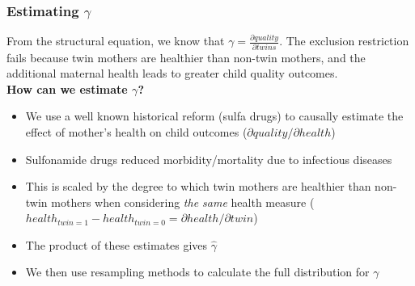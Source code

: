 \documentclass[9pt,letterpaper,subeqn]{beamer}
\begin{document}



\begin{frame}[label=gammaDiscuss]
  \frametitle{Estimating $\gamma$}
From the structural equation, we know that $\gamma=\frac{\partial quality}{\partial twins}$.  The exclusion restriction fails because twin mothers are healthier than non-twin mothers, and the additional maternal health leads to greater child quality outcomes.
\vspace{4mm} \\

\textbf{How can we estimate $\gamma$?}
  \begin{itemize}
  \item We use a well known historical reform (sulfa drugs) to causally estimate the effect of mother's health on child outcomes ($\partial quality/\partial health$)
  \item Sulfonamide drugs reduced morbidity/mortality due to infectious diseases
  \item This is scaled by the degree to which twin mothers are healthier than non-twin mothers when considering \emph{the same} health measure ($health_{twin=1}-health_{twin=0}=\partial health/\partial twin$)
  \item The product of these estimates gives $\hat\gamma$ %
  \item We then use resampling methods to calculate the full distribution for $\gamma$
  \end{itemize}
\end{frame}
\end{document}
